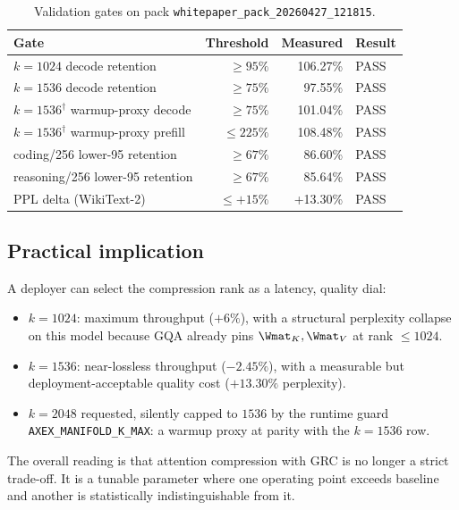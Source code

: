 \documentclass[11pt]{article}
\begin{document}
\begin{table}[h]\centering\footnotesize
\caption{Validation gates on pack \texttt{whitepaper\_pack\_20260427\_121815}.}
\begin{tabular}{@{}lrrl@{}}
\toprule
Gate & Threshold & Measured & Result\\
\midrule
$k{=}1024$ decode retention             & $\geq 95\%$ & 106.27\% & PASS\\
$k{=}1536$ decode retention             & $\geq 75\%$ &  97.55\% & PASS\\
$k{=}1536^\dagger$ warmup-proxy decode  & $\geq 75\%$ & 101.04\% & PASS\\
$k{=}1536^\dagger$ warmup-proxy prefill & $\leq 225\%$& 108.48\% & PASS\\
coding/256 lower-95 retention           & $\geq 67\%$ &  86.60\% & PASS\\
reasoning/256 lower-95 retention        & $\geq 67\%$ &  85.64\% & PASS\\
PPL delta (WikiText-2)                  & $\leq +15\%$&  +13.30\% & PASS\\
\bottomrule
\end{tabular}
\end{table}

\subsection{Practical implication}

A deployer can select the compression rank as a latency, quality dial:
\begin{itemize}
\item $k{=}1024$: maximum throughput ($+6\%$), with a structural
perplexity collapse on this model because GQA already pins
$\Wmat_K,\Wmat_V$ at rank $\leq 1024$.
\item $k{=}1536$: near-lossless throughput ($-2.45\%$), with a measurable
but deployment-acceptable quality cost ($+13.30\%$ perplexity).
\item $k{=}2048$ requested, silently capped to $1536$ by the runtime
guard \texttt{AXEX\_MANIFOLD\_K\_MAX}: a warmup proxy at parity with the
$k{=}1536$ row.
\end{itemize}
The overall reading is that attention compression with GRC is no longer a
strict trade-off. It is a tunable parameter where one operating point
exceeds baseline and another is statistically indistinguishable from it.

\clearpage
\printbibliography
\end{document}
